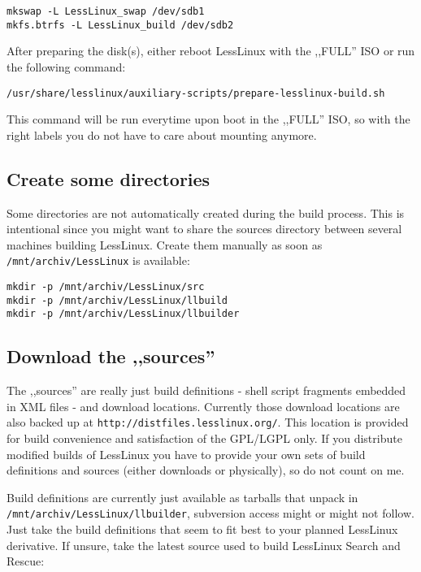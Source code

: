 \begin{verbatim}mkswap -L LessLinux_swap /dev/sdb1
mkfs.btrfs -L LessLinux_build /dev/sdb2
\end{verbatim} 

After preparing the disk(s), either reboot LessLinux with the ,,FULL'' ISO or run the following command:

\begin{verbatim}/usr/share/lesslinux/auxiliary-scripts/prepare-lesslinux-build.sh\end{verbatim}

This command will be run everytime upon boot in the ,,FULL'' ISO, so with the right labels you do not have to care about mounting anymore.

\subsection{Create some directories}

Some directories are not automatically created during the build process. This is intentional since you might want to share the sources directory between several machines building LessLinux. Create them manually as soon as \texttt{/mnt/archiv/LessLinux} is available: 

\begin{verbatim}mkdir -p /mnt/archiv/LessLinux/src
mkdir -p /mnt/archiv/LessLinux/llbuild
mkdir -p /mnt/archiv/LessLinux/llbuilder\end{verbatim}

\subsection{Download the ,,sources''}

The ,,sources'' are really just build definitions - shell script fragments embedded in XML files - and download locations. Currently those download locations are also backed up at \texttt{http://distfiles.lesslinux.org/}. This location is provided for build convenience and satisfaction of the GPL/LGPL only. If you distribute modified builds of LessLinux you have to provide your own sets of build definitions and sources (either downloads or physically), so do not count on me.

Build definitions are currently just available as tarballs that unpack in \texttt{/mnt/archiv/LessLinux/llbuilder}, subversion access might or might not follow. Just take the build definitions that seem to fit best to your planned LessLinux derivative. If unsure, take the latest source used to build LessLinux Search and Rescue:

